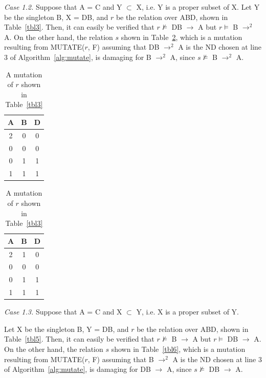 {\em Case 1.2.}
Suppose that A = C and Y $\subset$ X, i.e. Y is a proper subset of X.
Let Y be the singleton B, X = DB,
and $r$ be the relation over ABD, shown in Table~\ref{tbl3}.
Then, it can easily be verified that 
$r \not\models$ DB $\to$ A but $r \models$ B $\to^2$ A.
On the other hand, the relation $s$ shown in Table~\ref{tbl4},
which is a mutation resulting from MUTATE($r$, F) assuming that 
DB $\to^2$ A is the ND chosen at line 3 of Algorithm~\ref{alg:mutate},
is damaging for B $\to^2$ A, since $s \not\models$ B $\to^2$ A.

\begin{table}[ht]
\begin{minipage}[b]{7cm}
\begin{center}
\begin{tabular}{|c|c|c|} \hline
A & B & D \\ \hline
2 & 0 & 0 \\
0 & 0 & 0 \\
0 & 1 & 1 \\ 
1 & 1 & 1 \\ \hline
\end{tabular}
\end{center}
\caption{\label{tbl3} Example relation for Case 1.2.} 
\end{minipage}
\hfill
\begin{minipage}[b]{7cm}
\begin{center}
\begin{tabular}{|c|c|c|} \hline
A & B & D \\ \hline
2 & 1 & 0 \\
0 & 0 & 0 \\
0 & 1 & 1 \\ 
1 & 1 & 1 \\ \hline
\end{tabular}
\end{center}
\caption{\label{tbl4} A mutation of $r$ shown in Table~\ref{tbl3}} 
\end{minipage}
\end{table}

{\em Case 1.3.}
Suppose that A = C and X $\subset$ Y, i.e. X is a proper subset of Y.

Let X be the singleton B, Y = DB,
and $r$ be the relation over ABD, shown in Table~\ref{tbl5}.
Then, it can easily be verified that 
$r \not\models$ B $\to$ A but $r \models$ DB $\to$ A.
On the other hand, the relation $s$ shown in Table~\ref{tbl6},
which is a mutation resulting from MUTATE($r$, F) assuming that 
B $\to^2$ A is the ND chosen at line 3 of Algorithm~\ref{alg:mutate},
is damaging for DB $\to$ A, since $s \not\models$ DB $\to$ A.

